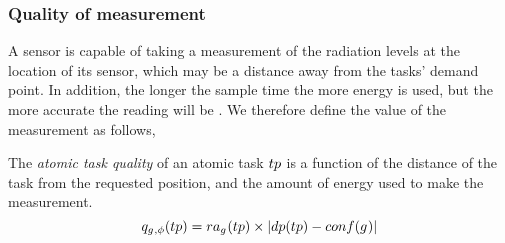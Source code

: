 \newcommand{\functionAtomicTaskQualitySignature}[2]{
	\functionSignature{q_{\varAgent{}{}, \varTime{}{}}} {\varAtomicTask{}{}}
}
\newcommand{\functionCompositeTaskValue}[2]{
	\functionSignature{ctv}{\varCompositeTask{}{}}
}
\subsubsection*{Quality of measurement}


A sensor is capable of taking a measurement of the radiation levels at the location of its sensor, which may be a distance away from the tasks' demand point. In addition, the longer the sample time the more energy is used, but the more accurate the reading will be \cite{dummy}. We therefore define the value of the measurement as follows,

\begin{definition}
	The \textit{atomic task quality} of an atomic task $\varAtomicTask{}{}$ is a function of the distance of the task from the requested position, and the amount of energy used to make the measurement.
	\begin{equation}
		\functionAtomicTaskQualitySignature{}{} = \functionTaskResourceAllocation{}{} \times \funcSize{
				\functionTaskDemandPoint{}{} - \functionDeployment{\varAgent{}{}}{}
		}{}
	\end{equation}
\end{definition}

